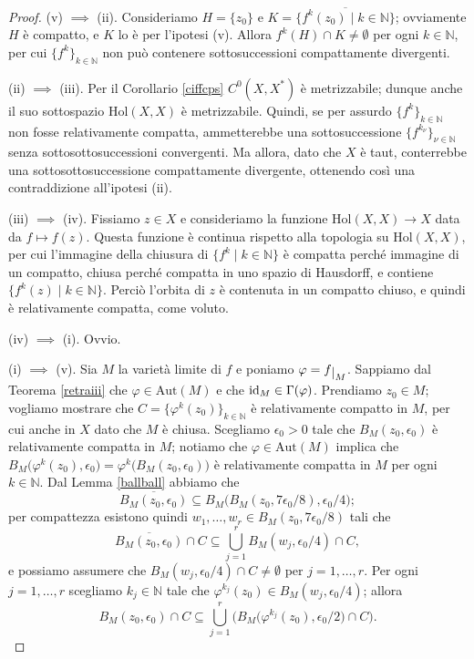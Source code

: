 \begin{proof}
    (v) $\implies$ (ii). Consideriamo $H=\{z_0\}$ e $K=\overline{\{f^k(z_0)\mid k\in\mathbb{N}\}}$; ovviamente $H$ è compatto, e $K$ lo è per l'ipotesi (v). Allora $f^k(H)\cap K\not=\emptyset$ per ogni $k\in\mathbb{N}$, per cui $\{f^k\}_{k \in \mathbb{N}}$ non può contenere sottosuccessioni compattamente divergenti.

    (ii) $\implies$ (iii). Per il Corollario \ref{ciffcps} $C^0(X,X^*)$ è metrizzabile; dunque anche il suo sottospazio $\text{Hol}(X,X)$ è metrizzabile. Quindi, se per assurdo $\{f^k\}_{k \in \mathbb{N}}$ non fosse relativamente compatta, ammetterebbe una sottosuccessione $\{f^{k_\nu}\}_{\nu\in\mathbb{N}}$ senza sottosottosuccessioni convergenti. Ma allora, dato che $X$ è taut, conterrebbe una sottosottosuccessione compattamente divergente, ottenendo così una contraddizione all'ipotesi (ii).

    (iii) $\implies$ (iv). Fissiamo $z\in X$ e consideriamo la funzione $\text{Hol}(X,X)\longrightarrow X$ data da $f\longmapsto f(z)$. Questa funzione è continua rispetto alla topologia su $\text{Hol}(X,X)$, per cui l'immagine della chiusura di $\{f^k\mid k\in\mathbb{N}\}$ è compatta perché immagine di un compatto, chiusa perché compatta in uno spazio di Hausdorff, e contiene $\{f^k(z)\mid k\in\mathbb{N}\}$. Perciò l'orbita di $z$ è contenuta in un compatto chiuso, e quindi è relativamente compatta, come voluto.

    (iv) $\implies$ (i). Ovvio.

    (i) $\implies$ (v). Sia $M$ la varietà limite di $f$ e poniamo $\varphi=f\restrict{M}$. Sappiamo dal Teorema \ref{retraiii} che $\varphi\in\text{Aut}(M)$ e che $\operatorname{id}_M\in\Gamma(\varphi)$. Prendiamo $z_0 \in M$; vogliamo mostrare che $C=\{\varphi^k(z_0)\}_{k\in\mathbb{N}}$ è relativamente compatto in $M$, per cui anche in $X$ dato che $M$ è chiusa. Scegliamo $\epsilon_0>0$ tale che $B_M(z_0,\epsilon_0)$ è relativamente compatta in $M$; notiamo che $\varphi\in\text{Aut}(M)$ implica che $B_M\big(\varphi^k(z_0),\epsilon_0\big)=\varphi^k\big(B_M(z_0,\epsilon_0)\big)$ è relativamente compatta in $M$ per ogni $k \in \mathbb{N}$. Dal Lemma \ref{ballball} abbiamo che
    $$\overline{B_M(z_0,\epsilon_0)} \subseteq B_M\big(B_M(z_0,7\epsilon_0/8),\epsilon_0/4\big);$$
    per compattezza esistono quindi $w_1,\dots,w_r \in B_M(z_0,7\epsilon_0/8)$ tali che
    $$\overline{B_M(z_0,\epsilon_0)}\cap C\subseteq \bigcup_{j=1}^r B_M(w_j,\epsilon_0/4)\cap C,$$
    e possiamo assumere che $B_M(w_j,\epsilon_0/4)\cap C\not=\emptyset$ per $j=1,\dots,r$.
    Per ogni $j=1,\dots, r$ scegliamo $k_j\in\mathbb{N}$ tale che $\varphi^{k_j}(z_0)\in B_M(w_j,\epsilon_0/4)$; allora
    \begin{equation}\label{capci}
        B_M(z_0,\epsilon_0)\cap C \subseteq \bigcup_{j=1}^r \Big(B_M\big(\varphi^{k_j}(z_0),\epsilon_0/2\big)\cap C\Big).
    \end{equation}


\end{proof}
